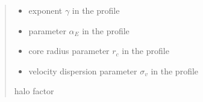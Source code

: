 \documentclass[letterpaper,10pt,english]{sphinxmanual}
\begin{document}
\begin{fulllineitems}
\begin{quote}
\begin{description}
\begin{itemize}
\item {} 
\sphinxAtStartPar
{} \textendash{} exponent \(\gamma\) in the {\hyperref[\detokenize{diffsph.profiles:diffsph.profiles.templates.hdz}]{}} profile

\item {} 
\sphinxAtStartPar
{} \textendash{} parameter \(\alpha_E\) in the {\hyperref[\detokenize{diffsph.profiles:diffsph.profiles.templates.enst}]{}} profile

\item {} 
\sphinxAtStartPar
{} \textendash{} core radius parameter \(r_c\) in the {\hyperref[\detokenize{diffsph.profiles:diffsph.profiles.templates.cnfw}]{}} profile

\item {} 
\sphinxAtStartPar
{} \textendash{} velocity dispersion parameter \(\sigma_v\) in the {\hyperref[\detokenize{diffsph.profiles:diffsph.profiles.templates.sis}]{}} profile

\end{itemize}

\sphinxAtStartPar
halo factor

\end{description}\end{quote}

\end{fulllineitems}

\end{document}

